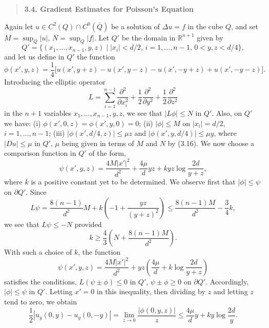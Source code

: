 
\begin{quote}
\textbf{3.4. Gradient Estimates for Poisson's Equation}
\end{quote}

Again let $u \in C^2(Q) \cap C^0(\overline{Q})$ be a solution of $\Delta u = f$ in the cube $Q$, and set $M=\sup_Q |u|$, $N=\sup_Q |f|$. Let $Q'$ be the domain in $\mathbb{R}^{n+1}$ given by
\[
Q'=\{(x_1,\ldots,x_{n-1},y,z)\mid |x_i|<d/2,\, i=1,\ldots,n-1,\, 0<y,z<d/4\},
\]
and let us define in $Q'$ the function
\[
\phi(x',y,z)=\frac14\bigl[u(x',y+z)-u(x',y-z)-u(x',-y+z)+u(x',-y-z)\bigr].
\]
Introducing the elliptic operator
\[
L=\sum_{i=1}^{n-1}\frac{\partial^2}{\partial x_i^2}+\frac12\frac{\partial^2}{\partial y^2}+\frac12\frac{\partial^2}{\partial z^2}
\]
in the $n+1$ variables $x_1,\ldots,x_{n-1},y,z$, we see that $|L\phi|\leq N$ in $Q'$. Also, on $Q'$ we have: (i) $\phi(x',0,z)=\phi(x',y,0)=0$; (ii) $|\phi|\leq M$ on $|x_i|=d/2$, $i=1,\ldots,n-1$; (iii) $|\phi(x',d/4,z)|\leq \mu z$ and $|\phi(x',y,d/4)|\leq \mu y$, where $|Du|\leq \mu$ in $Q'$, $\mu$ being given in terms of $M$ and $N$ by (3.16). We now choose a comparison function in $Q'$ of the form,
\[
\tag{3.17}
\psi(x',y,z)=\frac{4M|x'|^2}{d^2}+\frac{4\mu}{d}yz+kyz\log\frac{2d}{y+z},
\]
where $k$ is a positive constant yet to be determined. We observe first that $|\phi|\leq \psi$ on $\partial Q'$. Since
\[
L\psi=\frac{8(n-1)}{d^2}M+k\left(-1+\frac{yz}{(y+z)^2}\right)\leq \frac{8(n-1)M}{d^2}-\frac34k,
\]
we see that $L\psi\leq -N$ provided
\[
k\geq \frac43\left(N+\frac{8(n-1)M}{d^2}\right).
\]
With such a choice of $k$, the function
\[
\psi(x',y,z)=\frac{4M|x'|^2}{d^2}+yz\left(\frac{4\mu}{d}+k\log\frac{2d}{y+z}\right)
\]
satisfies the conditions, $L(\psi\pm\phi)\leq 0$ in $Q'$, $\psi\pm\phi\geq 0$ on $\partial Q'$. Accordingly, $|\phi|\leq \psi$ in $Q'$. Letting $x'=0$ in this inequality, then dividing by $z$ and letting $z$ tend to zero, we obtain
\[
\tag{3.18}
\frac12|u_y(0,y)-u_y(0,-y)|=\lim_{z\to 0}\frac{|\phi(0,y,z)|}{z}\leq \frac{4\mu}{d}y+ky\log\frac{2d}{y}.
\]


